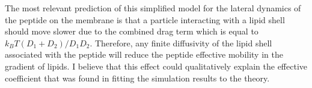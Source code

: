 The most relevant prediction of this simplified model for the lateral dynamics of the peptide on the membrane is that a particle interacting with a lipid shell should move slower due to the combined drag term which is equal to $k_BT(D_1+D_2)/D_1D_2$. Therefore, any finite diffusivity of the lipid shell associated with the peptide will reduce the peptide effective mobility in the gradient of lipids. I believe that this effect could qualitatively explain the effective coefficient that was found in fitting the simulation results to the theory.





